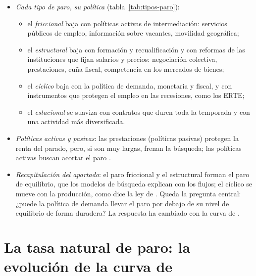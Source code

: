 \documentclass[11pt]{article}
\begin{document}
\begin{itemize}
\item \emph{Cada tipo de paro, su política} (tabla~\ref{tab:tipos-paro}):
  \begin{itemize}
  \item el \emph{friccional} baja con políticas activas de intermediación: servicios públicos de empleo, información sobre vacantes, movilidad geográfica;
  \item el \emph{estructural} baja con formación y recualificación y con reformas de las instituciones que fijan salarios y precios: negociación colectiva, prestaciones, cuña fiscal, competencia en los mercados de bienes;
  \item el \emph{cíclico} baja con la política de demanda, monetaria y fiscal, y con instrumentos que protegen el empleo en las recesiones, como los ERTE;
  \item el \emph{estacional} se suaviza con contratos que duren toda la temporada y con una actividad más diversificada.
  \end{itemize}
\item \emph{Políticas activas y pasivas}: las prestaciones (políticas pasivas) protegen la renta del parado, pero, si son muy largas, frenan la búsqueda; las políticas activas buscan acortar el paro .
\end{itemize}

\begin{itemize}
\item \emph{Recapitulación del apartado}: el paro friccional y el estructural forman el paro de equilibrio, que los modelos de búsqueda explican con los flujos; el cíclico se mueve con la producción, como dice la ley de . Queda la pregunta central: ¿puede la política de demanda llevar el paro por debajo de su nivel de equilibrio de forma duradera? La respuesta ha cambiado con la curva de .
\end{itemize}


\section{La tasa natural de paro: la evolución\cortetitulo{} de la curva de }\label{sec:tasa-natural}
\end{document}
